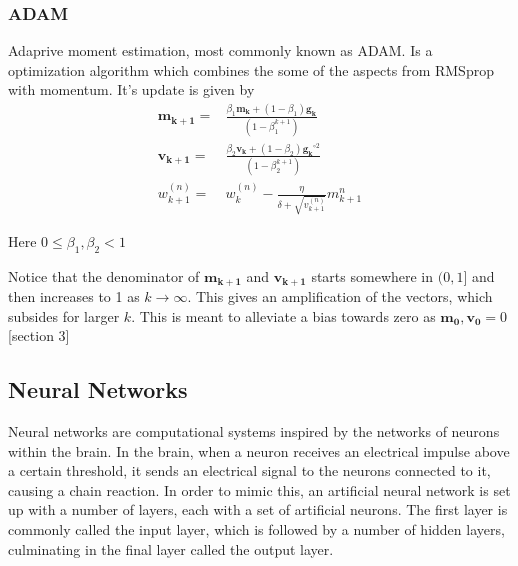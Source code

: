 \documentclass{article}
\theoremstyle{definition}
\begin{document}
\subsubsection{ADAM}
Adaprive moment estimation, most commonly known as ADAM. Is a optimization algorithm which combines the some of the aspects from RMSprop with momentum. It's update is given by
\begin{align*}
    \mathbf{m_{k+1}} =& \frac{\beta_1 \mathbf{m_k} + (1- \beta_1) \mathbf{g_k}}{\left(1 - \beta_1^{k+1}\right)}\\
    \mathbf{v_{k+1}} =& \frac{\beta_2 \mathbf{v_k} + (1-\beta_2) \mathbf{g_k}^{\circ 2}}{\left(1-\beta_2^{k+1}\right)}\\
    w_{k+1}^{(n)} =& w_k^{(n)} - \frac{\eta}{\delta + \sqrt{v_{k+1}^{(n)}}} m_{k+1}^{n}
\end{align*}

Here $0 \leq \beta_1,\beta_2 < 1$ 
\par
\vspace{1mm}
Notice that the denominator of $\mathbf{m_{k+1}}$ and $\mathbf{v_{k+1}}$ starts somewhere in $(0,1]$ and then increases to 1 as $k \to \infty$. This gives an amplification of the vectors, which subsides for larger $k$. This is meant to alleviate a bias towards zero as  $\mathbf{m_0}, \mathbf{v_0} = 0$ \cite{kingma2014adam}[section 3]

\subsection{Neural Networks}

Neural networks are computational systems inspired by the networks of neurons within the brain. In the brain, when a neuron receives an electrical impulse above a certain threshold, it sends an electrical signal to the neurons connected to it, causing a chain reaction. In order to mimic this, an artificial neural network is set up with a number of layers, each with a set of artificial neurons. The first layer is commonly called the input layer, which is followed by a number of hidden layers, culminating in the final layer called the output layer.
\end{document}
